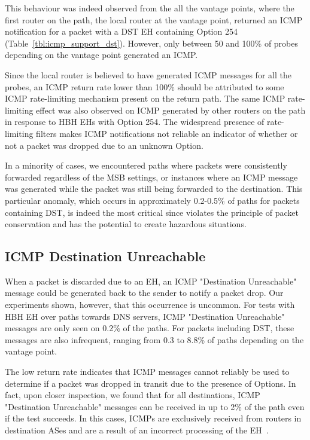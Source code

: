 \documentclass[conference]{IEEEtran}
\begin{document}
This behaviour was indeed observed from the all the vantage points, where the
first router on the path, the local router at the vantage point, returned an
ICMP notification for a packet with a DST EH containing Option 254
(Table~\ref{tbl:icmp_support_dst}).  However, only between 50 and 100\% of
probes depending on the vantage point generated an ICMP.

Since the local router is believed to have generated ICMP messages for all the
probes, an ICMP return rate lower than 100\% should be attributed to some ICMP
rate-limiting mechanism present on the return path.  The same ICMP
rate-limiting effect was also observed on ICMP generated by other routers on
the path in response to HBH EHs with Option 254.  The widespread presence of
rate-limiting filters makes ICMP notifications not reliable an indicator of
whether or not a packet was dropped due to an unknown Option.

In a minority of cases, we encountered paths where packets were consistently
forwarded regardless of the MSB settings, or instances where an ICMP message
was generated while the packet was still being forwarded to the destination.
This particular anomaly, which occurs in approximately 0.2-0.5\% of paths for
packets containing DST, is indeed the most critical since violates the
principle of packet conservation and has the potential to create hazardous
situations.  


\subsection{ICMP Destination Unreachable}

When a packet is discarded due to an EH, an ICMP "Destination Unreachable"
message could be generated back to the sender to notify a packet drop.  Our
experiments shown, however, that this occurrence is uncommon.  For tests with
HBH EH over paths towards DNS servers, ICMP "Destination Unreachable" messages
are only seen on 0.2\% of the paths. For packets including DST, these messages
are also infrequent, ranging from 0.3 to 8.8\% of paths depending on the
vantage point. 

The low return rate indicates that ICMP messages cannot reliably be used to
determine if a packet was dropped in transit due to the presence of Options.
In fact, upon closer inspection, we found that for all destinations, ICMP
"Destination Unreachable" messages can be received in up to 2\% of the path
even if the test succeeds. In this cases, ICMPs are exclusively received from
routers in destination ASes and are a result of an incorrect processing of the
EH~\cite{RFC8200}.
\end{document}
